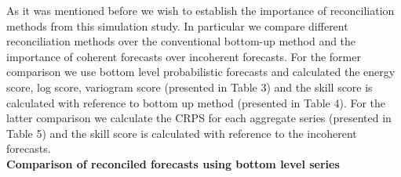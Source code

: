 \documentclass[a4paper, 11pt]{article}
\begin{document}
\noindent
As it was mentioned before we wish to establish the importance of reconciliation methods from this simulation study. In particular we compare different reconciliation methods over the conventional bottom-up method and the importance of coherent forecasts over incoherent forecasts. For the former comparison we use bottom level probabilistic forecasts and calculated the energy score, log score, variogram score (presented in Table 3) and the skill score is calculated with reference to bottom up method (presented in Table 4). For the latter comparison we calculate the CRPS for each aggregate series (presented in Table 5) and the skill score is calculated with reference to the incoherent forecasts.\\  

\pagebreak
\noindent
\textbf{Comparison of reconciled forecasts using bottom level series}

\begin{center}
	
	
\end{center}
\end{document}

